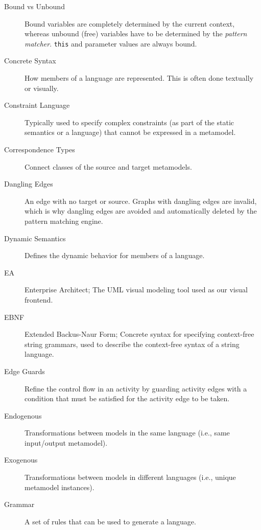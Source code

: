 \begin{description}
\item[Bound vs Unbound] %
Bound variables are completely determined by the current context, whereas unbound (free) variables have to be determined by the \emph{pattern matcher}.
\texttt{this} and parameter values are always bound.

\item[Concrete Syntax] %
How members of a language are represented. This is often done textually or visually.

\item[Constraint Language] %
Typically used to specify complex constraints (as part of the static semantics or a language) that cannot be expressed in a metamodel.

\item[Correspondence Types] %
Connect classes of the source and target metamodels.

\item[Dangling Edges] %
An edge with no target or source. Graphs with dangling edges are invalid, which is why dangling edges are avoided and automatically deleted by the pattern
matching engine.

\item[Dynamic Semantics] %
Defines the dynamic behavior for members of a language.

\item[EA] %
Enterprise Architect; The UML visual modeling tool used as our visual frontend.

\item[EBNF] %
Extended Backus-Naur Form; Concrete syntax for specifying context-free string grammars, used to describe the context-free syntax of a string
language.

\item[Edge Guards] %
Refine the control flow in an activity by guarding activity edges with a condition that must be satisfied for the activity edge to be taken.

\item[Endogenous] %
Transformations between models in the same language (i.e., same input/output metamodel). 
 
\item[Exogenous] %
Transformations between models in different languages (i.e., unique metamodel instances). 

\item[Grammar] %
A set of rules that can be used to generate a language. 


\end{description}
